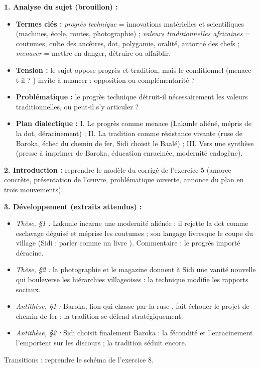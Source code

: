 \documentclass[11pt]{article}
\begin{document}
\begin{corrige}
\textbf{1. Analyse du sujet (brouillon) :}
\begin{itemize}
\item \textbf{Termes clés :} \emph{progrès technique} = innovations matérielles et scientifiques (machines, école, routes, photographie) ; \emph{valeurs traditionnelles africaines} = coutumes, culte des ancêtres, dot, polygamie, oralité, autorité des chefs ; \emph{menacer} = mettre en danger, détruire ou affaiblir.
\item \textbf{Tension :} le sujet oppose progrès et tradition, mais le conditionnel (\og menace-t-il ? \fg) invite à nuancer : opposition ou complémentarité ?
\item \textbf{Problématique :} le progrès technique détruit-il nécessairement les valeurs traditionnelles, ou peut-il s'y articuler ?
\item \textbf{Plan dialectique :} I. Le progrès comme menace (Lakunle aliéné, mépris de la dot, déracinement) ; II. La tradition comme résistance vivante (ruse de Baroka, échec du chemin de fer, Sidi choisit le Baalé) ; III. Vers une synthèse (presse à imprimer de Baroka, éducation enracinée, modernité endogène).
\end{itemize}

\textbf{2. Introduction :} reprendre le modèle du corrigé de l'exercice 5 (amorce concrète, présentation de l'œuvre, problématique ouverte, annonce du plan en trois mouvements).

\textbf{3. Développement (extraits attendus) :}
\begin{itemize}
\item \emph{Thèse, §1 :} Lakunle incarne une modernité aliénée : il rejette la dot comme \og esclavage déguisé \fg{} et méprise les coutumes ; son langage livresque le coupe du village (Sidi : \og parler comme un livre \fg). Commentaire : le progrès importé déracine.
\item \emph{Thèse, §2 :} la photographie et le magazine donnent à Sidi une vanité nouvelle qui bouleverse les hiérarchies villageoises : la technique modifie les rapports sociaux.
\item \emph{Antithèse, §1 :} Baroka, \og lion qui chasse par la ruse \fg, fait échouer le projet de chemin de fer : la tradition se défend stratégiquement.
\item \emph{Antithèse, §2 :} Sidi choisit finalement Baroka : la fécondité et l'enracinement l'emportent sur les discours ; la tradition séduit encore.
\end{itemize}
Transitions : reprendre le schéma de l'exercice 8.


\end{corrige}
\end{document}

